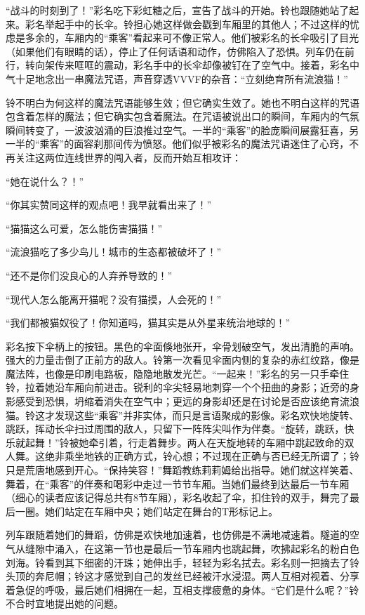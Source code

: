 “战斗的时刻到了！”彩名吃下彩虹糖之后，宣告了战斗的开始。铃也跟随她站了起来。彩名举起手中的长伞。铃担心她这样做会戳到车厢里的其他人；不过这样的忧虑是多余的，车厢内的“乘客”看起来可不像正常人。他们被彩名的长伞吸引了目光（如果他们有眼睛的话），停止了任何话语和动作，仿佛陷入了恐惧。列车仍在前行，转向架传来哐哐的震动，彩名手中的长伞却像被钉在了空气中。接着，彩名中气十足地念出一串魔法咒语，声音穿透VVVF的杂音：“立刻绝育所有流浪猫！”

铃不明白为何这样的魔法咒语能够生效；但它确实生效了。她也不明白这样的咒语包含着怎样的魔法；但它确实包含着魔法。在咒语被说出口的瞬间，车厢内的气氛瞬间转变了，一波波汹涌的巨浪推过空气。一半的“乘客”的脸庞瞬间展露狂喜，另一半的“乘客”的面容刹那间传为愤怒。他们似乎被彩名的魔法咒语迷住了心窍，不再关注这两位连线世界的闯入者，反而开始互相攻讦：

“她在说什么？！”

“你其实赞同这样的观点吧！我早就看出来了！”

“猫猫这么可爱，怎么能伤害猫猫！”

“流浪猫吃了多少鸟儿！城市的生态都被破坏了！”

“还不是你们没良心的人弃养导致的！”

“现代人怎么能离开猫呢？没有猫摸，人会死的！”

“我们都被猫奴役了！你知道吗，猫其实是从外星来统治地球的！”

彩名按下伞柄上的按钮。黑色的伞面倏地张开，伞骨划破空气，发出清脆的声响。强大的力量击倒了正前方的敌人。铃第一次看见伞面内侧的复杂的赤红纹路，像是魔法阵，也像是印刷电路板，隐隐地散发光芒。“一起来！”彩名的另一只手牵住铃，拉着她沿车厢向前进击。锐利的伞尖轻易地刺穿一个个扭曲的身影；近旁的身影感受到恐惧，坍缩着消失在空气中；更远的身影却还是在讨论是否应该绝育流浪猫。铃这才发现这些“乘客”并非实体，而只是言语聚成的影像。彩名欢快地旋转、跳跃，挥动长伞扫过周围的敌人，只留下一阵阵尖叫作为伴奏。“旋转，跳跃，快乐就起舞！”铃被她牵引着，行走着舞步。两人在天旋地转的车厢中跳起致命的双人舞。这绝非乘坐地铁的正确方式，铃心想；不过现在正确与否已经无所谓了；铃只是荒唐地感到开心。“保持笑容！”舞蹈教练莉莉姆给出指导。她们就这样笑着、舞着，在“乘客”的伴奏和喝彩中走过一节节车厢。当她们最终到达最后一节车厢（细心的读者应该记得总共有8节车厢），彩名收起了伞，扣住铃的双手，舞完了最后一圈。她们站定在车厢中央；她们站定在舞台的T形标记上。

列车跟随着她们的舞蹈，仿佛是欢快地加速着，也仿佛是不满地减速着。隧道的空气从缝隙中涌入，在这第一节也是最后一节车厢内也跳起舞，吹拂起彩名的粉白色刘海。铃看到其下细密的汗珠；她伸出手，轻轻为彩名拭去。彩名则一把摘去了铃头顶的奔尼帽；铃这才感觉到自己的发丝已经被汗水浸湿。两人互相对视着、分享着急促的呼吸，最后她们相拥在一起，互相支撑疲惫的身体。“它们是什么呢？”铃不合时宜地提出她的问题。

